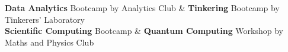\documentclass[a4paper]{article}
\newcommand{\lhs}[1]{{{\small\textit{#1}}}}
\newcommand{\rhsmall}[1]{\hfill{\footnotesize{\textsl{(#1)}}}}
\newcommand{\rhse}[1]{\hfill{\small{\textsl{(#1)}}}\\[-12pt]}
\newcommand{\head}[1]{{\CFont{\textbf{#1}}}\vspace{-0.2em}}
\newcommand{\CFont}{\fontsize{11}{13.2}\selectfont}
\begin{document}
\textbf{Data Analytics} Bootcamp by Analytics Club \& \textbf{Tinkering} Bootcamp by Tinkerers' Laboratory\\\textbf{Scientific Computing} Bootcamp \& \textbf{Quantum Computing} Workshop by Maths and Physics Club
\end{document}
